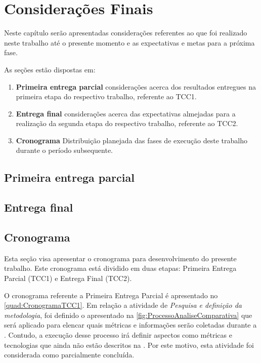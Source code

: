\chapter{Considerações Finais}

Neste capítulo serão apresentadas considerações referentes ao que foi realizado
neste trabalho até o presente momento e as expectativas e metas para a próxima
fase.

  As seções estão dispostas em:

  \begin{enumerate}
    \item \textbf{Primeira entrega parcial} considerações acerca dos resultados
    entregues na primeira etapa do respectivo trabalho, referente ao \gls{TCC1}.
    \item \textbf{Entrega final} considerações acerca das expectativas almejadas
    para a realização da segunda etapa do respectivo trabalho, referente ao \gls{TCC2}.
    \item \textbf{Cronograma} Distribuição planejada das fases de execução deste
    trabalho durante o período subsequente.
  \end{enumerate}

\section{Primeira entrega parcial}
\section{Entrega final}
\section{Cronograma}

Esta seção visa apresentar o cronograma para desenvolvimento do presente trabalho. Este
cronograma está dividido em duas etapas: Primeira Entrega Parcial (\gls{TCC1}) e Entrega Final
(\gls{TCC2}).

O cronograma referente a Primeira Entrega Parcial é apresentado no \autoref{quad:CronogramaTCC1}.
Em relação a atividade de \textit{Pesquisa e definição da metodologia}, foi definido o
 apresentado na \autoref{fig:ProcessoAnaliseComparativa}
que será aplicado para elencar quais métricas e informações serão coletadas durante a
.  Contudo, a execução desse processo irá definir aspectos como métricas
e tecnologias que ainda não estão descritos na . Por este motivo,
esta atividade foi considerada como parcialmente concluída.

